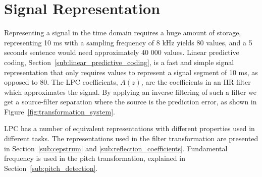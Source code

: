 
\section{Signal Representation} %
\label{the:signal_representation}
Representing a signal in the time domain requires a huge amount of storage, \eg representing 10 ms with a sampling frequency of 8 kHz yields 80 values, and a 5 seconds sentence would need approximately 40 000 values. Linear predictive coding, Section~\ref{sub:linear_predictive_coding}, is a fast and simple signal representation that only requires  values to represent a signal segment of 10 ms, as opposed to 80. The LPC coefficients, $A(z)$, are the coefficients in an IIR filter which approximates the signal. By applying an inverse filtering of such a filter we get a source-filter separation where the source is the prediction error, as shown in Figure~\ref{fig:transformation_system}.

LPC has a number of equivalent representations with different properties used in different tasks. The representations used in the filter transformation are presented in Section~\ref{sub:cepstrum} and \ref{sub:reflection_coefficients}. Fundamental frequency is used in the pitch transformation, explained in Section~\ref{sub:pitch_detection}.


